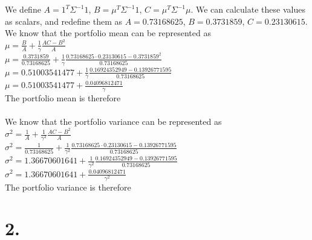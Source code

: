 \documentclass{article}
\begin{document}
{%
We define $A = 1^T \Sigma^{-1} 1$, $B = \mu^T \Sigma^{-1} 1$, $C = \mu^T \Sigma^{-1} \mu$. We can calculate these values as scalars, and redefine them as $A = 0.73168625$, $B = 0.3731859$, $C = 0.23130615$.
We know that the portfolio mean can be represented as \\
$\mu = \frac{B}{A} + \frac{1}{\gamma} \frac{AC - B^2}{A}$ \\
$\mu = \frac{0.3731859}{0.73168625} + \frac{1}{\gamma} \frac{0.73168625 \cdot 0.23130615 - 0.3731859^2}{0.73168625}$ \\
$\mu = 0.51003541477 + \frac{1}{\gamma} \frac{0.16924352949 - 0.13926771595}{0.73168625}$ \\
$\mu = 0.51003541477 + \frac{0.04096812471}{\gamma}$ \\
The portfolio mean is therefore  \\ \\
We know that the portfolio variance can be represented as \\
$\sigma^2 = \frac{1}{A} + \frac{1}{\gamma^2} \frac{AC - B^2}{A}$ \\
$\sigma^2 = \frac{1}{0.73168625} + \frac{1}{\gamma^2} \frac{0.73168625 \cdot 0.23130615 - 0.13926771595}{0.73168625}$ \\
$\sigma^2 = 1.36670601641 + \frac{1}{\gamma^2} \frac{0.16924352949 - 0.13926771595}{0.73168625}$ \\
$\sigma^2 = 1.36670601641 + \frac{0.04096812471}{\gamma^2}$ \\
The portfolio variance is therefore 

}

\section*{2.}
\end{document}
